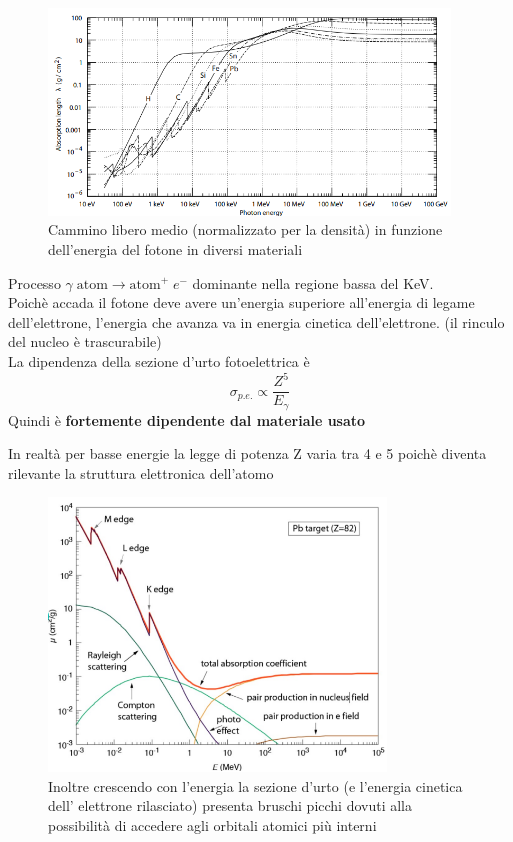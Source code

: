 \begin{figure}[H]
    \centering
    \includegraphics[width=0.95\textwidth,frame]{Chapters/images/Interazione_radiazione_materia/image-20220220113210434.png}
    \captionsetup{width=0.95\linewidth}
    \caption{Cammino libero medio (normalizzato per la densità) in funzione dell'energia del fotone in diversi materiali}
    \label{fig:freemeanpath}
\end{figure}
Processo $\gamma \; \text{atom} \to \text{atom}^+ \; e^-$ dominante nella regione bassa del KeV.
\\
Poichè accada il fotone deve avere un'energia superiore all'energia di legame dell'elettrone, l'energia che avanza va in energia cinetica dell'elettrone. (il rinculo del nucleo è trascurabile)
\\
La dipendenza della sezione d'urto fotoelettrica è
\[\sigma_{p.e.} \propto \frac{Z^5}{E_\gamma}\]
Quindi è \textbf{fortemente dipendente dal materiale usato}
\begin{details}
    In realtà per basse energie la legge di potenza Z varia tra 4 e 5 poichè diventa rilevante la struttura elettronica dell'atomo
\end{details}
\begin{figure}[H]
    \centering
    \includegraphics[width=0.8\textwidth,frame]{Chapters/images/Interazione_radiazione_materia/image-20220220120913778.png}
    \captionsetup{width=0.8\linewidth}
    \caption{Inoltre crescendo con l'energia la sezione d'urto (e l'energia cinetica dell' elettrone rilasciato) presenta bruschi picchi dovuti alla possibilità di accedere agli orbitali atomici più interni}
    \label{fig:gammacrossec}
\end{figure}
